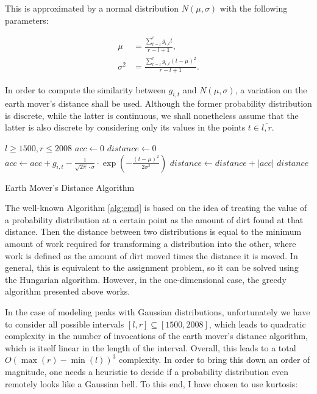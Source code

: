 This is approximated by a normal distribution $N \left( \mu, \sigma \right)$ with the following parameters:

\begin{align}
\label{eq:mu-gaussian-model}
\mu &= \frac{\sum_{t=l}^{r} g_{i, t} t}{r - l + 1}, \\
\label{eq:sigma-gaussian-model}
\sigma^2 &= \frac{\sum_{t=l}^{r} g_{i, t} \left( t - \mu \right)^2}{r - l + 1}.
\end{align}

In order to compute the similarity between $g_{i, t}$ and $N \left( \mu, \sigma \right)$, a variation on the earth mover's distance \cite{rubner98metric} shall be used. Although the former probability distribution is discrete, while the latter is continuous, we shall nonetheless assume that the latter is also discrete by considering only its values in the points $t \in \overline{l, r}$.

\begin{algorithm}

\begin{algorithmic}[1]
\Require $l \geq 1500, r \leq 2008$
\State $acc \gets 0$
\State $distance \gets 0$
    \State $acc \gets acc + g_{i, t} - \frac{1}{\sqrt{2 \pi} \cdot \sigma} \cdot \exp \left( - \frac{\left( t - \mu \right)^2}{2 \sigma^2} \right)$
    \State $distance \gets distance + \left| acc \right|$
\EndFor
\State \Return $distance$
\end{algorithmic}

\caption{Earth Mover's Distance Algorithm}
\label{alg:emd}

\end{algorithm}

The well-known Algorithm \autoref{alg:emd} is based on the idea of treating the value of a probability distribution at a certain point as the amount of dirt found at that distance. Then the distance between two distributions is equal to the minimum amount of work required for transforming a distribution into the other, where work is defined as the amount of dirt moved times the distance it is moved. In general, this is equivalent to the assignment problem, so it can be solved using the Hungarian algorithm. However, in the one-dimensional case, the greedy algorithm presented above works.

In the case of modeling peaks with Gaussian distributions, unfortunately we have to consider all possible intervals $\left[ l, r \right] \subseteq \left[ 1500, 2008 \right]$, which leads to quadratic complexity in the number of invocations of the earth mover's distance algorithm, which is itself linear in the length of the interval. Overall, this leads to a total $O \left( \max(r) - \min(l) \right)^3$ complexity. In order to bring this down an order of magnitude, one needs a heuristic to decide if a probability distribution even remotely looks like a Gaussian bell. To this end, I have chosen to use kurtosis:

